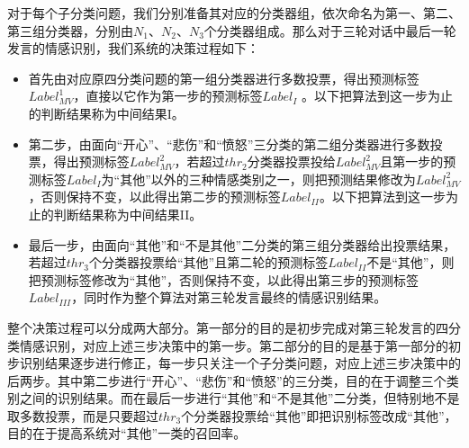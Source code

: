 对于每个子分类问题，我们分别准备其对应的分类器组，依次命名为第一、第二、第三组分类器，分别由$N_1$、$N_2$、$N_3$个分类器组成。那么对于三轮对话中最后一轮发言的情感识别，我们系统的决策过程如下：

\begin{itemize}

\item 首先由对应原四分类问题的第一组分类器进行多数投票，得出预测标签$Label^{1}_{MV}$，直接以它作为第一步的预测标签$Label_{I}$ 。以下把算法到这一步为止的判断结果称为中间结果I。

\item 第二步，由面向“开心”、“悲伤”和“愤怒”三分类的第二组分类器进行多数投票，得出预测标签$Label^{2}_{MV}$，若超过$thr_{2}$分类器投票投给$Label^{2}_{MV}$且第一步的预测标签$Label_{I}$为“其他”以外的三种情感类别之一，则把预测结果修改为$Label^{2}_{MV}$，否则保持不变，以此得出第二步的预测标签$Label_{II}$。以下把算法到这一步为止的判断结果称为中间结果II。

\item 最后一步，由面向“其他”和“不是其他”二分类的第三组分类器给出投票结果，若超过$thr_{3}$个分类器投票给“其他”且第二轮的预测标签$Label_{II}$不是“其他”，则把预测标签修改为“其他”，否则保持不变，以此得出第三步的预测标签$Label_{III}$，同时作为整个算法对第三轮发言最终的情感识别结果。

\end{itemize}

整个决策过程可以分成两大部分。第一部分的目的是初步完成对第三轮发言的四分类情感识别，对应上述三步决策中的第一步。第二部分的目的是基于第一部分的初步识别结果逐步进行修正，每一步只关注一个子分类问题，对应上述三步决策中的后两步。其中第二步进行“开心”、“悲伤”和“愤怒”的三分类，目的在于调整三个类别之间的识别结果。而在最后一步进行“其他”和“不是其他”二分类，但特别地不是取多数投票，而是只要超过$thr_{3}$个分类器投票给“其他”即把识别标签改成“其他”，目的在于提高系统对“其他”一类的召回率。

